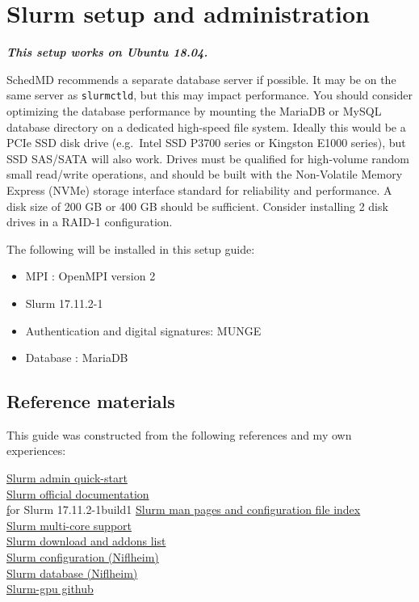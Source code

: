 \chapter{Slurm setup and administration} \label{ch:slurmsetup}

\textbf{\emph{This setup works on Ubuntu 18.04.}}

SchedMD recommends a separate database server if possible. It may be on the same server as \texttt{slurmctld}, but this may impact performance. You should consider optimizing the database performance by mounting the MariaDB or MySQL database directory on a dedicated high-speed file system. Ideally this would be a PCIe SSD disk drive (e.g.\ Intel SSD P3700 series or Kingston E1000 series), but SSD SAS/SATA will also work. Drives must be qualified for high-volume random small read/write operations, and should be built with the Non-Volatile Memory Express (NVMe) storage interface standard for reliability and performance. A disk size of 200 GB or 400 GB should be sufficient. Consider installing 2 disk drives in a RAID-1 configuration.

The following will be installed in this setup guide:

\begin{itemize}
\item MPI : OpenMPI version 2
\item Slurm 17.11.2-1
\item Authentication and digital signatures: MUNGE
\item Database : MariaDB
\end{itemize}

\section{Reference materials} \label{sec:slurmguides}

This guide was constructed from the following references and my own experiences:

\href{https://slurm.schedmd.com/quickstart_admin.html}{Slurm admin quick-start} \\
\indent \href{https://slurm.schedmd.com/documentation.html}{Slurm official documentation} \\
\indent \href{slurm-wlm-doc} for Slurm 17.11.2-1build1
\indent \href{https://slurm.schedmd.com/man_index.html}{Slurm man pages and configuration file index} \\
\indent \href{https://slurm.schedmd.com/mc_support.html}{Slurm multi-core support} \\
\indent \href{https://slurm.schedmd.com/download.html}{Slurm download and addons list} \\
\indent \href{https://wiki.fysik.dtu.dk/niflheim/Slurm_configuration}{Slurm configuration (Niflheim)} \\
\indent \href{https://wiki.fysik.dtu.dk/niflheim/Slurm_database}{Slurm database (Niflheim)} \\
\indent \href{https://github.com/dholt/slurm-gpu}{Slurm-gpu github}

